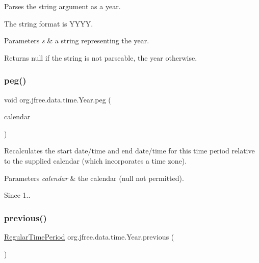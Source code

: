 Parses the string argument as a year. 

The string format is Y\+Y\+YY.


\begin{DoxyParams}{Parameters}
{\em s} & a string representing the year.\\
\hline
\end{DoxyParams}
\begin{DoxyReturn}{Returns}
{\ttfamily null} if the string is not parseable, the year otherwise. 
\end{DoxyReturn}
\mbox{\label{classorg_1_1jfree_1_1data_1_1time_1_1_year_a98c518e97ade2b6267e1b421b0f91162}} 
\subsubsection{\texorpdfstring{peg()}{peg()}}
{\footnotesize\ttfamily void org.\+jfree.\+data.\+time.\+Year.\+peg (\begin{DoxyParamCaption}\item[{Calendar}]{calendar }\end{DoxyParamCaption})}

Recalculates the start date/time and end date/time for this time period relative to the supplied calendar (which incorporates a time zone).


\begin{DoxyParams}{Parameters}
{\em calendar} & the calendar ({\ttfamily null} not permitted).\\
\hline
\end{DoxyParams}
\begin{DoxySince}{Since}
1.. 
\end{DoxySince}
\mbox{\label{classorg_1_1jfree_1_1data_1_1time_1_1_year_a0a068d4f45b412bde0a3d50181a5662a}} 
\subsubsection{\texorpdfstring{previous()}{previous()}}
{\footnotesize\ttfamily \mbox{\hyperlink{classorg_1_1jfree_1_1data_1_1time_1_1_regular_time_period}{Regular\+Time\+Period}} org.\+jfree.\+data.\+time.\+Year.\+previous (\begin{DoxyParamCaption}{ }\end{DoxyParamCaption})}

